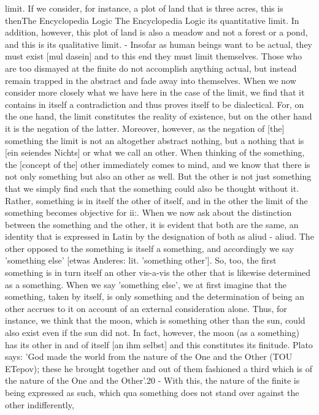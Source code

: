limit. If we consider, for instance, a plot of land that is three acres, this is thenThe Encyclopedia Logic The Encyclopedia Logic
its quantitative limit. In addition, however, this plot of land is also a meadow
and not a forest or a pond, and this is its qualitative limit. - Insofar as human
beings want to be actual, they must exist [mul dasein] and to this end they must
limit themselves. Those who are too dismayed at the finite do not accomplish
anything actual, but instead remain trapped in the abstract and fade away into
themselves.
When we now consider more closely what we have here in the case of the
limit, we find that it contains in itself a contradiction and thus proves itself to
be dialectical. For, on the one hand, the limit constitutes the reality of existence,
but on the other hand it is the negation of the latter. Moreover, however, as the
negation of [the] something the limit is not an altogether abstract nothing, but a
nothing that is [ein seiendes Nichts] or what we call an other. When thinking of
the something, the [concept of the] other immediately comes to mind, and we
know that there is not only something but also an other as well. But the other
is not just something that we simply find such that the something could also
be thought without it. Rather, something is in itself the other of itself, and in
the other the limit of the something becomes objective for ii:. When we now ask
about the distinction between the something and the other, it is evident that both
are the same, an identity that is expressed in Latin by the designation of both
as aliud - aliud. The other opposed to the something is itself a something, and
accordingly we say 'something else' [etwas Anderes: lit. 'something other']. So, too,
the first something is in turn itself an other vis-a-vis the other that is likewise
determined as a something. When we say 'something else', we at first imagine that
the something, taken by itself, is only something and the determination of being
an other accrues to it on account of an external consideration alone. Thus, for
instance, we think that the moon, which is something other than the sun, could
also exist even if the sun did not. In fact, however, the moon (as a something) has
its other in and of itself [an ihm selbst] and this constitutes its finitude. Plato says:
'God made the world from the nature of the One and the Other (TOU ETepov);
these he brought together and out of them fashioned a third which is of the nature
of the One and the Other'.20 - With this, the nature of the finite is being expressed
as such, which qua something does not stand over against the other indifferently,
